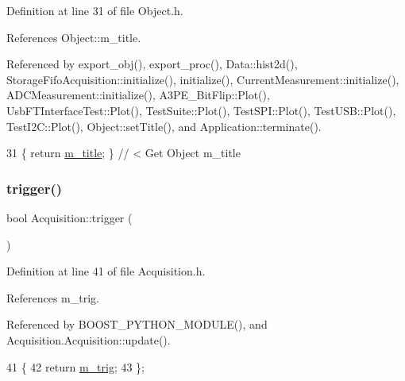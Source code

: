 Definition at line 31 of file Object.\+h.



References Object\+::m\+\_\+title.



Referenced by export\+\_\+obj(), export\+\_\+proc(), Data\+::hist2d(), Storage\+Fifo\+Acquisition\+::initialize(), initialize(), Current\+Measurement\+::initialize(), A\+D\+C\+Measurement\+::initialize(), A3\+P\+E\+\_\+\+Bit\+Flip\+::\+Plot(), Usb\+F\+T\+Interface\+Test\+::\+Plot(), Test\+Suite\+::\+Plot(), Test\+S\+P\+I\+::\+Plot(), Test\+U\+S\+B\+::\+Plot(), Test\+I2\+C\+::\+Plot(), Object\+::set\+Title(), and Application\+::terminate().


\begin{DoxyCode}
31 \{ \textcolor{keywordflow}{return} \hyperlink{classObject_affbeea1953eb5163573b92fad8f75727}{m\_title};      \} \textcolor{comment}{// < Get Object m\_title}
\end{DoxyCode}
\mbox{\label{classAcquisition_a6f680938eb6a42d57dfa7466e8852af9}} 
\subsubsection{\texorpdfstring{trigger()}{trigger()}}
{\footnotesize\ttfamily bool Acquisition\+::trigger (\begin{DoxyParamCaption}{ }\end{DoxyParamCaption})\hspace{0.3cm}{\ttfamily [inline]}}



Definition at line 41 of file Acquisition.\+h.



References m\+\_\+trig.



Referenced by B\+O\+O\+S\+T\+\_\+\+P\+Y\+T\+H\+O\+N\+\_\+\+M\+O\+D\+U\+L\+E(), and Acquisition.\+Acquisition\+::update().


\begin{DoxyCode}
41                  \{
42     \textcolor{keywordflow}{return} \hyperlink{classAcquisition_a953bdc1bf56206b6df33b648af32a24f}{m\_trig};
43   \};
\end{DoxyCode}
\mbox{\label{classObject_a84f99f70f144a83e1582d1d0f84e4e62}} 
